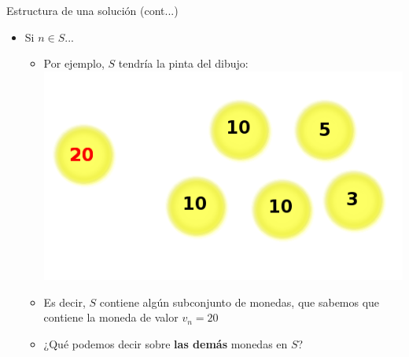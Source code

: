 \documentclass{beamer}
\begin{document}
\begin{frame}{Estructura de una solución (cont...)}
    \begin{itemize}
    \item Si $n \in S$...
            \begin{itemize}
                 \item Por ejemplo, $S$ tendría la pinta del dibujo:
                 \includegraphics[scale=0.4]{monedas1.png}
                 
                 \item Es decir, $S$ contiene algún subconjunto de monedas, que sabemos que contiene la moneda de valor $v_n = 20$
                 \item ¿Qué podemos decir sobre \textbf{las demás} monedas en $S$?
            \end{itemize}
    
    \end{itemize} 
\end{frame}
\end{document}
